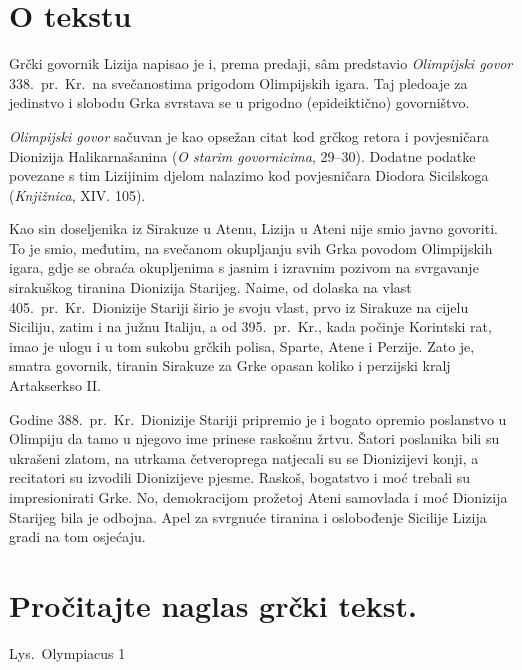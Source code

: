 

\section*{O tekstu}

Grčki govornik Lizija napisao je i, prema predaji, sâm predstavio \textit{Olimpijski govor} 338.\ pr.~Kr.\ na svečanostima prigodom Olimpijskih igara. Taj pledoaje za jedinstvo i slobodu Grka svrstava se u prigodno (epideiktično) govorništvo.

\textit{Olimpijski govor} sačuvan je kao opsežan citat kod grčkog retora i povjesničara Dionizija Halikarnašanina (\textit{O starim govornicima}, 29–30). Dodatne podatke povezane s tim Lizijinim djelom nalazimo kod povjesničara Diodora Sicilskoga (\textit{Knjižnica}, XIV. 105). 

Kao sin doseljenika iz Sirakuze u Atenu, Lizija u Ateni nije smio javno govoriti. To je smio, međutim, na svečanom okupljanju svih Grka povodom Olimpijskih igara, gdje se obraća okupljenima s jasnim i izravnim pozivom na svrgavanje sirakuškog tiranina Dionizija Starijeg. Naime, od dolaska na vlast 405.\ pr.~Kr.\ Dionizije Stariji širio je svoju vlast, prvo iz Sirakuze na cijelu Siciliju, zatim i na južnu Italiju, a od 395.\ pr.~Kr., kada počinje Korintski rat, imao je ulogu i u tom sukobu grčkih polisa, Sparte, Atene i Perzije. Zato je, smatra govornik, tiranin Sirakuze za Grke opasan koliko i perzijski kralj Artakserkso II.

Godine 388.\ pr.~Kr.\ Dionizije Stariji pripremio je i bogato opremio poslanstvo u Olimpiju da tamo u njegovo ime prinese raskošnu žrtvu. Šatori poslanika bili su ukrašeni zlatom, na utrkama četveroprega natjecali su se Dionizijevi konji, a recitatori su izvodili Dionizijeve pjesme. Raskoš, bogatstvo i moć trebali su impresionirati Grke. No, demokracijom prožetoj Ateni samovlada i moć Dionizija Starijeg bila je odbojna. Apel za svrgnuće tiranina i oslobođenje Sicilije Lizija gradi na tom osjećaju.


\section*{Pročitajte naglas grčki tekst.}

Lys.\ Olympiacus 1

